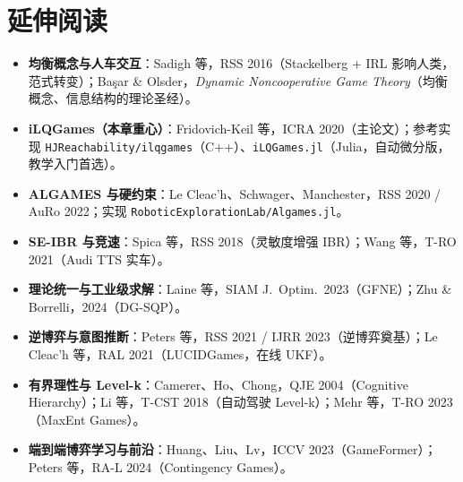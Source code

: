 \section*{延伸阅读}
\begin{itemize}
  \item \textbf{均衡概念与人车交互}：Sadigh 等，RSS 2016\cite{sadigh2016planning}（Stackelberg + IRL 影响人类，范式转变）；Ba\c{s}ar \& Olsder，\emph{Dynamic Noncooperative Game Theory}\cite{basar1999dynamic}（均衡概念、信息结构的理论圣经）。
  \item \textbf{iLQGames（本章重心）}：Fridovich-Keil 等，ICRA 2020\cite{fridovich2020efficient}（主论文）；参考实现 \texttt{HJReachability/\allowbreak ilqgames}（C++）、\texttt{iLQGames.jl}（Julia，自动微分版，教学入门首选）。
  \item \textbf{ALGAMES 与硬约束}：Le Cleac'h、Schwager、Manchester，RSS 2020 / AuRo 2022\cite{lecleach2022algames}；实现 \texttt{RoboticExplorationLab/\allowbreak Algames.\allowbreak jl}。
  \item \textbf{SE-IBR 与竞速}：Spica 等，RSS 2018\cite{spica2020realtime}（灵敏度增强 IBR）；Wang 等，T-RO 2021\cite{wang2021gametheoretic}（Audi TTS 实车）。
  \item \textbf{理论统一与工业级求解}：Laine 等，SIAM J.\ Optim.\ 2023\cite{laine2023computation}（GFNE）；Zhu \& Borrelli，2024\cite{zhu2024dgsqp}（DG-SQP）。
  \item \textbf{逆博弈与意图推断}：Peters 等，RSS 2021 / IJRR 2023\cite{peters2021inferring}（逆博弈奠基）；Le Cleac'h 等，RAL 2021\cite{lecleach2021lucidgames}（LUCIDGames，在线 UKF）。
  \item \textbf{有界理性与 Level-k}：Camerer、Ho、Chong，QJE 2004\cite{camerer2004cognitive}（Cognitive Hierarchy）；Li 等，T-CST 2018\cite{li2018game}（自动驾驶 Level-k）；Mehr 等，T-RO 2023\cite{mehr2023maximum}（MaxEnt Games）。
  \item \textbf{端到端博弈学习与前沿}：Huang、Liu、Lv，ICCV 2023\cite{huang2023gameformer}（GameFormer）；Peters 等，RA-L 2024\cite{peters2024contingency}（Contingency Games）。
\end{itemize}

